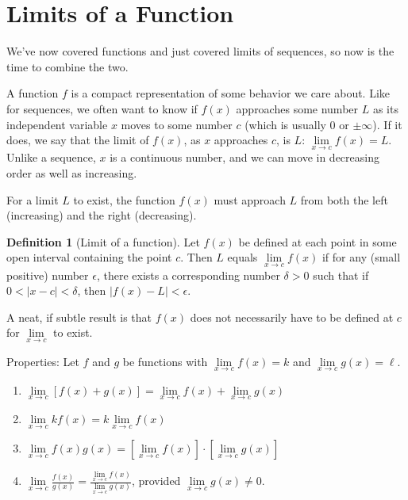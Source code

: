\documentclass[
]{book}
\providecommand{\tightlist}{%
  \setlength{\itemsep}{0pt}\setlength{\parskip}{0pt}}
\theoremstyle{definition}
\newtheorem{definition}{Definition}[chapter]
\theoremstyle{definition}
\theoremstyle{definition}
\theoremstyle{remark}
\begin{document}
\hypertarget{limitsfun}{%
\section{Limits of a Function}\label{limitsfun}}

We've now covered functions and just covered limits of sequences, so now is the time to combine the two.

A function \(f\) is a compact representation of some behavior we care about. Like for sequences, we often want to know if \(f(x)\) approaches some number \(L\) as its independent variable \(x\) moves to some number \(c\) (which is usually 0 or \(\pm\infty\)). If it does, we say that the limit of \(f(x)\), as \(x\) approaches \(c\), is \(L\): \(\lim\limits_{x \to c} f(x)=L\). Unlike a sequence, \(x\) is a continuous number, and we can move in decreasing order as well as increasing.

For a limit \(L\) to exist, the function \(f(x)\) must approach \(L\) from both the left (increasing) and the right (decreasing).

\begin{definition}[Limit of a function]
\protect\hypertarget{def:unnamed-chunk-5}{}{\label{def:unnamed-chunk-5} {} }Let \(f(x)\) be defined at each point in some open interval containing the point \(c\). Then \(L\) equals \(\lim\limits_{x \to c} f(x)\) if for any (small positive) number \(\epsilon\), there exists a corresponding number \(\delta>0\) such that if \(0<|x-c|<\delta\), then \(|f(x)-L|<\epsilon\).
\end{definition}

A neat, if subtle result is that \(f(x)\) does not necessarily have to be defined at \(c\) for \(\lim\limits_{x \to c}\) to exist.

Properties: Let \(f\) and \(g\) be functions with \(\lim\limits_{x \to c} f(x)=k\) and \(\lim\limits_{x \to c} g(x)=\ell\).

\begin{enumerate}
\def\labelenumi{\arabic{enumi}.}
\tightlist
\item
  \(\lim\limits_{x \to c}[f(x)+g(x)]=\lim\limits_{x \to c} f(x)+ \lim\limits_{x \to c} g(x)\)
\item
  \(\lim\limits_{x \to c} kf(x) = k\lim\limits_{x \to c} f(x)\)
\item
  \(\lim\limits_{x \to c} f(x) g(x) = \left[\lim\limits_{x \to c} f(x)\right]\cdot \left[\lim\limits_{x \to c} g(x)\right]\)
\item
  \(\lim\limits_{x \to c} \frac{f(x)}{g(x)} = \frac{\lim\limits_{x \to c} f(x)}{\lim\limits_{x \to c} g(x)}\), provided \(\lim\limits_{x \to c} g(x)\ne 0\).
\end{enumerate}
\end{document}
